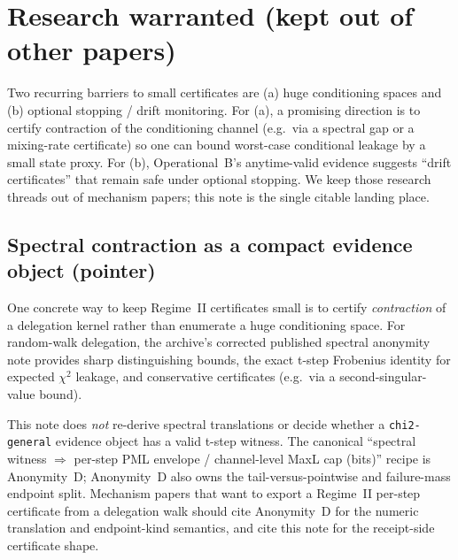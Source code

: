 \documentclass[11pt]{article}
\begin{document}
\section{Research warranted (kept out of other papers)}
Two recurring barriers to small certificates are (a) huge conditioning spaces and (b) optional stopping / drift monitoring.
For (a), a promising direction is to certify contraction of the conditioning channel (e.g.\ via a spectral gap or a mixing-rate certificate)
so one can bound worst-case conditional leakage by a small state proxy.\cite{series:spectral}
For (b), Operational~B's anytime-valid evidence suggests ``drift certificates'' that remain safe under optional stopping.\cite{series:operationalB}
We keep those research threads out of mechanism papers; this note is the single citable landing place.

\subsection{Spectral contraction as a compact evidence object (pointer)}
\label{sec:spectral-cert}

One concrete way to keep Regime~II certificates small is to certify \emph{contraction} of a delegation kernel rather than enumerate a huge conditioning space.
For random-walk delegation, the archive's corrected published spectral anonymity note provides sharp distinguishing bounds, the exact t-step Frobenius identity for expected $\chi^2$ leakage, and conservative certificates (e.g.\ via a second-singular-value bound).\cite{series:spectral}

This note does \emph{not} re-derive spectral translations or decide whether a \texttt{chi2-general} evidence object has a valid t-step witness.
The canonical ``spectral witness $\Rightarrow$ per-step PML envelope / channel-level MaxL cap (bits)'' recipe is Anonymity~D; Anonymity~D also owns the tail-versus-pointwise and failure-mass endpoint split.\cite{series:spectral2budget}
Mechanism papers that want to export a Regime~II per-step certificate from a delegation walk should cite Anonymity~D for the numeric translation and endpoint-kind semantics, and cite this note for the receipt-side certificate shape.
\end{document}
